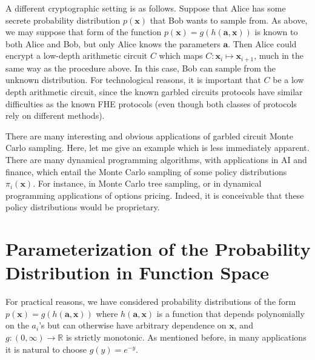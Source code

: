 \documentclass[12pt]{article}
\begin{document}
A different cryptographic setting is as follows.  Suppose that Alice has some secrete probability distribution $p(\textbf{x})$ that Bob wants to sample from.  As above, we may suppose that form of the function $p(\textbf{x}) = g(h(\textbf{a},\textbf{x}))$ is known to both Alice and Bob, but only Alice knows the parameters $\textbf{a}$.  Then Alice could encrypt a low-depth arithmetic circuit $C$ which maps $C : \textbf{x}_i \mapsto \textbf{x}_{i+1}$, much in the same way as the procedure above.  In this case, Bob can sample from the unknown distribution.  For technological reasons, it is important that $C$ be a low depth arithmetic circuit, since the known garbled circuits protocols have similar difficulties as the known FHE protocols (even though both classes of protocols rely on different methods).

There are many interesting and obvious applications of garbled circuit Monte Carlo sampling.  Here, let me give an example which is less immediately apparent.  There are many dynamical programming algorithms, with applications in AI and finance, which entail the Monte Carlo sampling of some policy distributions $\pi_i(\textbf{x})$.  For instance, in Monte Carlo tree sampling, or in dynamical programming applications of options pricing.  Indeed, it is conceivable that these policy distributions would be proprietary.

\section{Parameterization of the Probability Distribution in Function Space}

For practical reasons, we have considered probability distributions of the form $p(\textbf{x}) = g(h(\textbf{a},\textbf{x}))$ where $h(\textbf{a},\textbf{x})$ is a function that depends polynomially on the $a_i$'s but can otherwise have arbitrary dependence on $\textbf{x}$, and $g : (0,\infty) \to \mathbb{R}$ is strictly monotonic.  As mentioned before, in many applications it is natural to choose $g(y) = e^{-y}$.
\end{document}
